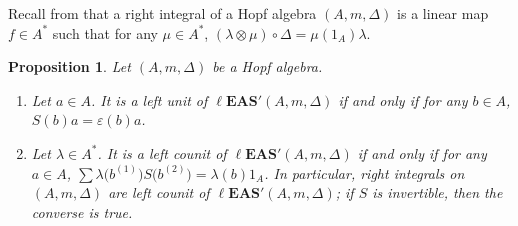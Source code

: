 \documentclass[pdftex]{sigma}
\numberwithin{equation}{section}
\newtheorem{Proposition}[Theorem]{Proposition}
 { \theoremstyle{definition}
\newtheorem{Definition}[Theorem]{Definition}
\newtheorem{Note}[Theorem]{Note}
\newtheorem{Example}[Theorem]{Example}
\newtheorem{Remark}[Theorem]{Remark}
\newtheorem{Notation}[Theorem]{Notation}}
\newcommand{\leas}{\ell\mathbf{EAS}}
\begin{document}
Recall from \cite{Sweedler1969-2} that a right integral of a Hopf algebra $(A,m,\Delta)$ is a linear map $f\in A^*$ such that for any $\mu\in A^*$,
$(\lambda \otimes \mu)\circ \Delta=\mu(1_A) \lambda$.

\begin{Proposition} \label{prop5.11}
Let $(A,m,\Delta)$ be a Hopf algebra.
\begin{enumerate}\itemsep=0pt
\item[$(1)$] Let $a\in A$. It is a left unit of $\leas'(A,m,\Delta)$ if and only if for any $b\in A$, $S(b)a=\varepsilon(b)a$.
\item[$(2)$] Let $\lambda \in A^*$. It is a left counit of $\leas'(A,m,\Delta)$ if and only if for any $a\in A$, \linebreak $\sum \lambda\bigl(b^{(1)}\bigr) S\bigl(b^{(2)}\bigr)=\lambda(b)1_A$.
In particular, right integrals on $(A,m,\Delta)$ are left counit of $\leas'(A,m,\Delta)$; if $S$ is invertible, then the converse is true.
\end{enumerate}\end{Proposition}
\end{document}
